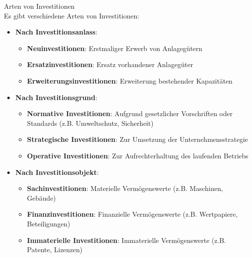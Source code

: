 \begin{definition}{Arten von Investitionen}\\
Es gibt verschiedene Arten von Investitionen:
\begin{itemize}
    \item \textbf{Nach Investitionsanlass}:
    \begin{itemize}
        \item \textbf{Neuinvestitionen}: Erstmaliger Erwerb von Anlagegütern
        \item \textbf{Ersatzinvestitionen}: Ersatz vorhandener Anlagegüter
        \item \textbf{Erweiterungsinvestitionen}: Erweiterung bestehender Kapazitäten
    \end{itemize}
    \item \textbf{Nach Investitionsgrund}:
    \begin{itemize}
        \item \textbf{Normative Investitionen}: Aufgrund gesetzlicher Vorschriften oder Standards (z.B. Umweltschutz, Sicherheit)
        \item \textbf{Strategische Investitionen}: Zur Umsetzung der Unternehmensstrategie
        \item \textbf{Operative Investitionen}: Zur Aufrechterhaltung des laufenden Betriebs
    \end{itemize}
    \item \textbf{Nach Investitionsobjekt}:
    \begin{itemize}
        \item \textbf{Sachinvestitionen}: Materielle Vermögenswerte (z.B. Maschinen, Gebäude)
        \item \textbf{Finanzinvestitionen}: Finanzielle Vermögenswerte (z.B. Wertpapiere, Beteiligungen)
        \item \textbf{Immaterielle Investitionen}: Immaterielle Vermögenswerte (z.B. Patente, Lizenzen)
    \end{itemize}
\end{itemize}
\end{definition}

